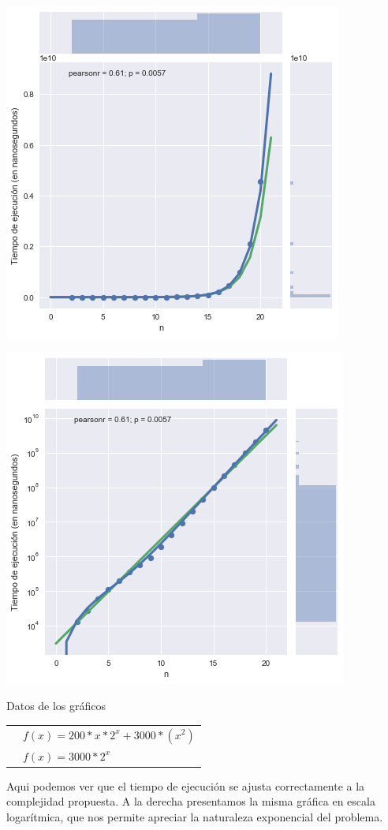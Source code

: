 \noindent
\begin{minipage}{0.49\textwidth}
	\hfill
	\includegraphics[scale=0.55]{img/exact-2n.png}
\end{minipage}
\hfill
\begin{minipage}{0.49\textwidth}
	\hfill
	\includegraphics[scale=0.55]{img/exact-2n-log.png}
\end{minipage}

\begin{center}
	Datos de los gráficos

	\begin{tabular}{ | l l |}
		\hline
		\tikzcircle[fill=blue] & $f(x) = 200 * x * 2^x + 3000 * (x^2)$ \\
		\tikzcircle[fill=green] & $f(x) = 3000 * 2^x$ \\
		\hline
	\end{tabular}
\end{center}

Aqui podemos ver que el tiempo de ejecución se ajusta correctamente a la complejidad propuesta. A la derecha presentamos la misma gráfica en escala logarítmica, que nos permite apreciar la naturaleza exponencial del problema.

